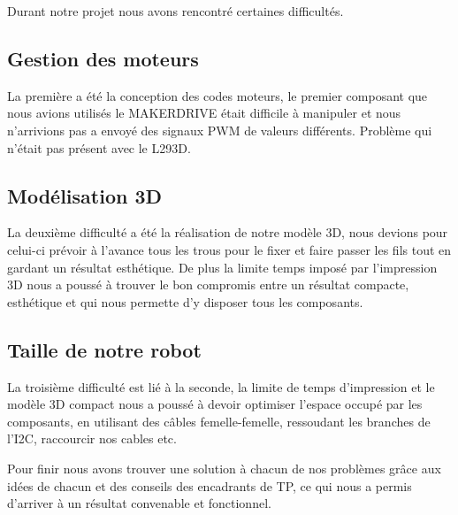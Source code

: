 Durant notre projet nous avons rencontré certaines difficultés.

\subsection{Gestion des moteurs}
La première a été la conception des codes moteurs, le premier composant que nous avions utilisés le MAKERDRIVE était difficile à manipuler et nous n'arrivions pas a envoyé des signaux PWM de valeurs différents. Problème qui n'était pas présent avec le L293D.

\subsection{Modélisation 3D}
La deuxième difficulté a été la réalisation de notre modèle 3D, nous devions pour celui-ci prévoir à l'avance tous les trous pour le fixer et faire passer les fils tout en gardant un résultat esthétique. De plus la limite temps imposé par l'impression 3D nous a poussé à trouver le bon compromis entre un résultat compacte, esthétique et qui nous permette d'y disposer tous les composants.

\subsection{Taille de notre robot}
La troisième difficulté est lié à la seconde, la limite de temps d'impression et le modèle 3D compact nous a poussé à devoir optimiser l'espace occupé par les composants, en utilisant des câbles femelle-femelle, ressoudant les branches de l'I2C, raccourcir nos cables etc.

Pour finir nous avons trouver une solution à chacun de nos problèmes grâce aux idées de chacun et des conseils des encadrants de TP, ce qui nous a permis d'arriver à un résultat convenable et fonctionnel.

\newpage